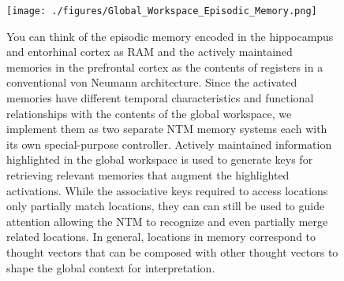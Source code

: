 


\begin{figure}
%
  \begin{center} 
    \texttt{[image: ./figures/Global\_Workspace\_Episodic\_Memory.png]} %
  \end{center}
%
  \caption{You can think of the episodic memory encoded in the hippocampus and entorhinal cortex as RAM and the actively maintained memories in the prefrontal cortex as the contents of registers in a conventional von Neumann architecture. Since the activated memories have different temporal characteristics and functional relationships with the contents of the global workspace, we implement them as two separate NTM memory systems each with its own special-purpose controller. Actively maintained information highlighted in the global workspace is used to generate keys for retrieving relevant memories that augment the highlighted activations. While the associative keys required to access locations only partially match locations, they can can still be used to guide attention allowing the NTM to recognize and even partially merge related locations. In general, locations in memory correspond to thought vectors that can be composed with other thought vectors to shape the global context for interpretation.}
%
  \label{fig_episodic}
%
\end{figure}



